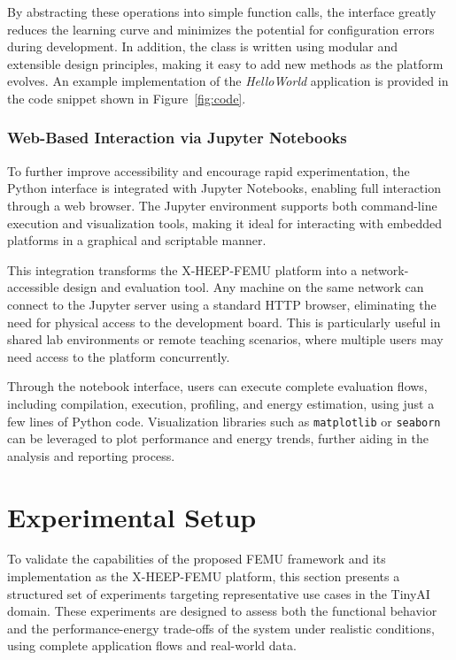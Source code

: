                 By abstracting these operations into simple function calls, the interface greatly reduces the learning curve and minimizes the potential for configuration errors during development. In addition, the class is written using modular and extensible design principles, making it easy to add new methods as the platform evolves. An example implementation of the \textit{HelloWorld} application is provided in the code snippet shown in Figure~\ref{fig:code}.
            
            \subsubsection*{Web-Based Interaction via Jupyter Notebooks}
            
                To further improve accessibility and encourage rapid experimentation, the Python interface is integrated with Jupyter Notebooks, enabling full interaction through a web browser. The Jupyter environment supports both command-line execution and visualization tools, making it ideal for interacting with embedded platforms in a graphical and scriptable manner.
                
                This integration transforms the \mbox{X-HEEP-FEMU} platform into a network-accessible design and evaluation tool. Any machine on the same network can connect to the Jupyter server using a standard HTTP browser, eliminating the need for physical access to the development board. This is particularly useful in shared lab environments or remote teaching scenarios, where multiple users may need access to the platform concurrently.
                
                Through the notebook interface, users can execute complete evaluation flows, including compilation, execution, profiling, and energy estimation, using just a few lines of Python code. Visualization libraries such as \texttt{matplotlib} or \texttt{seaborn} can be leveraged to plot performance and energy trends, further aiding in the analysis and reporting process.

    \section{Experimental Setup}
    \label{sec:experimental_setup}
    
        To validate the capabilities of the proposed \mbox{FEMU} framework and its implementation as the \mbox{X-HEEP-FEMU} platform, this section presents a structured set of experiments targeting representative use cases in the TinyAI domain. These experiments are designed to assess both the functional behavior and the performance-energy trade-offs of the system under realistic conditions, using complete application flows and real-world data.
        
